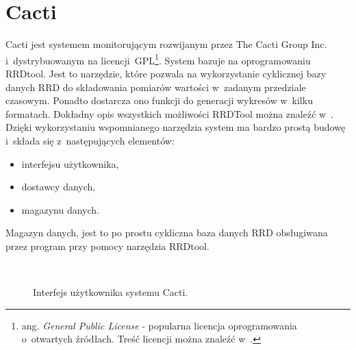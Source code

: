 \section[Cacti][Cacti]{Cacti}

Cacti\cite{www:Cacti} jest systemem monitorującym rozwijanym przez
The Cacti Group Inc. i~dystrybuowanym na licencji~GPL\footnote{
  ang. {\em General Public License} - popularna licencja
  oprogramowania o~otwartych źródłach. Treść licencji można znaleźć
  w~\cite{www:GPLv2}.}. System bazuje na oprogramowaniu
\mbox{RRDtool}\cite{www:RRDtool}. Jest to narzędzie, które pozwala na
wykorzystanie cyklicznej bazy danych RRD do składowania pomiarów
wartości w~zadanym przedziale czasowym. Ponadto dostarcza ono funkcji
do generacji wykresów w~kilku formatach. Dokładny opis wszystkich
możliwości RRDTool można znaleźć w~\cite{www:RRDtool}. Dzięki
wykorzystaniu wspomnianego narzędzia system ma bardzo prostą budowę
i~składa się z~następujących elementów:

\begin{itemize}
\item interfejsu użytkownika,
\item dostawcy danych,
\item magazynu danych.
\end{itemize}

Magazyn danych, jest to po prostu cykliczna baza danych RRD
obsługiwana przez program przy pomocy narzędzia RRDtool.

\begin{figure}[h]
\label{fig:CactiInterface}
\caption{Interfejs użytkownika systemu Cacti.}
\begin{center}
\\[0.1cm]
\end{center}
\end{figure}

